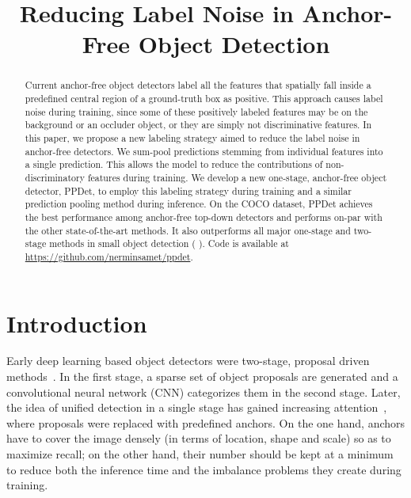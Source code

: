 \documentclass{bmvc2k}
\title{Reducing Label Noise in Anchor-Free Object Detection}
\begin{document}
\maketitle


\begin{abstract}



Current anchor-free object detectors label all the features that spatially fall inside a predefined central region of a ground-truth box as positive. This approach causes label noise during training, since some of these positively labeled features may be on the background or an occluder object, or they are simply not discriminative features. In this paper, we propose a new labeling strategy aimed to reduce the label noise in anchor-free detectors. We sum-pool predictions stemming from individual features into a single prediction. This allows the model to reduce the contributions of non-discriminatory features during training. We develop a new one-stage, anchor-free object detector, PPDet, to employ this labeling strategy during training and a similar prediction pooling method during inference. On the COCO dataset, PPDet achieves the best performance among anchor-free top-down detectors and performs on-par with the other state-of-the-art methods. It also outperforms all major one-stage and two-stage methods in small object detection ( ). Code is available at \url{https://github.com/nerminsamet/ppdet}. 


\end{abstract}





\section{Introduction}
\label{sec:intro}




Early deep learning based object detectors were two-stage, proposal driven methods~\cite{faster, fastrcnn}. In the first stage, a sparse set of object proposals are generated and a convolutional neural network (CNN) categorizes them in the second stage. Later, the idea of unified detection in a single stage has gained increasing attention~\cite{ssd,yolo3,retinanet, dssd}, where proposals were replaced with predefined anchors. On the one hand, anchors have to cover the image densely (in terms of location, shape and scale) so as to maximize recall; on the other hand, their number should be kept at a minimum to reduce both the inference time and the imbalance problems \cite{imbalance} they create during training. 
\end{document}
